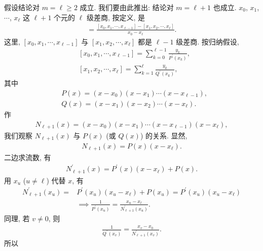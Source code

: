 \begin{pf}
    假设结论对 $m = \ell \geq 2$ 成立. 我们要由此推出: 结论对 $m = \ell + 1$ 也成立. $x_0$, $x_1$, $\cdots$, $x_{\ell}$ 这 $\ell + 1$ 个元的 $\ell$ 级差商, 按定义, 是
    \begin{align*}
        [x_{0}, x_{1}, \cdots, x_{\ell}] = \frac{[x_{0}, x_{1}, \cdots, x_{\ell - 1}] - [x_{1}, x_{2}, \cdots, x_{\ell}]}{x_0 - x_{\ell}}.
    \end{align*}
    这里, $[x_{0}, x_{1}, \cdots, x_{\ell - 1}]$ 与 $[x_{1}, x_{2}, \cdots, x_{\ell}]$ 都是 $\ell - 1$ 级差商. 按归纳假设,
    \begin{align*}
         & [x_{0}, x_{1}, \cdots, x_{\ell - 1}] = \sum_{k = 0}^{\ell-1} \frac{y_k}{P^{\prime} (x_k)}, \\
         & [x_{1}, x_{2}, \cdots, x_{\ell}] = \sum_{k = 1}^{\ell} \frac{y_k}{Q^{\prime} (x_k)},
    \end{align*}
    其中
    \begin{align*}
         & P(x) = (x - x_0) (x - x_1) \cdots (x - x_{\ell - 1}), \\
         & Q(x) = (x - x_1) (x - x_2) \cdots (x - x_{\ell}).
    \end{align*}
    作
    \begin{align*}
        N_{\ell + 1} (x) = (x - x_0) (x - x_1) \cdots (x - x_{\ell - 1}) (x - x_{\ell}),
    \end{align*}
    我们观察 $N_{\ell + 1} (x)$ 与 $P(x)$ (或 $Q(x)$) 的关系. 显然,
    \begin{align*}
        N_{\ell + 1} (x) = P(x) (x - x_{\ell}).
    \end{align*}
    二边求流数, 有
    \begin{align*}
        N_{\ell + 1}^{\prime} (x) = P^{\prime} (x) (x - x_{\ell}) + P(x).
    \end{align*}
    用 $x_u$ ($u \neq \ell$) 代替 $x$, 有
    \begin{align*}
        N_{\ell + 1}^{\prime} (x_u) = {} & P^{\prime} (x_u) (x_u - x_{\ell}) + P(x_u) = P^{\prime} (x_u) (x_u - x_{\ell})            \\
                                         & \implies \frac{1}{P^{\prime} (x_u)} = \frac{x_u - x_{\ell}}{N_{\ell + 1}^{\prime} (x_u)}.
    \end{align*}
    同理, 若 $v \neq 0$, 则
    \begin{align*}
        \frac{1}{Q^{\prime} (x_v)} = \frac{x_v - x_0}{N_{\ell + 1}^{\prime} (x_v)}.
    \end{align*}
    所以
    \begin{align*}

\end{align*}
\end{pf}
